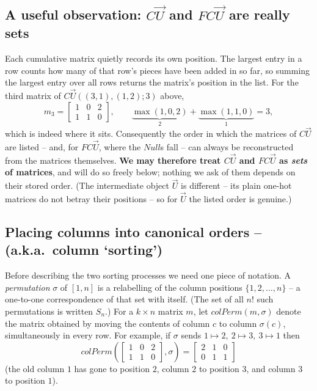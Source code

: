 \documentclass{article}
\begin{document}
\subsection*{A useful observation: $C\vec U$ and $FC\vec U$ are really sets}

Each cumulative matrix quietly records its own position.  The largest entry in a
row counts how many of that row's pieces have been added in so far, so summing the
largest entry over all rows returns the matrix's position in the list.  For the
third matrix of $C\vec U((3,1),(1,2);3)$ above,
\[
m_3=\begin{bmatrix}1&0&2\\1&1&0\end{bmatrix},
\qquad
\underbrace{\max(1,0,2)}_{2}+\underbrace{\max(1,1,0)}_{1}=3,
\]
which is indeed where it sits.  Consequently the order in which the matrices of
$C\vec U$ are listed -- and, for $FC\vec U$, where the $Null$s fall -- can always be
reconstructed from the matrices themselves.  \textbf{We may therefore treat
$C\vec U$ and $FC\vec U$ as \emph{sets} of matrices}, and will do so freely below;
nothing we ask of them depends on their stored order.  (The intermediate object
$\vec U$ is different -- its plain one-hot matrices do not betray their positions --
so for $\vec U$ the listed order is genuine.)

\subsection{Placing columns into canonical orders -- (a.k.a.~column `sorting')}
\label{subsec:sorting}

\label{def:colperm}Before describing the two sorting processes we need one piece of notation.  A
\emph{permutation} $\sigma$ of $[1,n]$ is a relabelling of the column positions
$\{1,2,\ldots,n\}$ -- a one-to-one correspondence of that set with itself.  (The set
of all $n!$ such permutations is written $S_n$.)  For a
$k\times n$ matrix $m$, let $colPerm(m,\sigma)$ denote the matrix obtained by moving
the contents of column $c$ to column $\sigma(c)$, simultaneously in every row.  For
example, if $\sigma$ sends $1\mapsto2,\ 2\mapsto3,\ 3\mapsto1$ then
$$
colPerm\left(\begin{bmatrix}1&0&2\\1&1&0\end{bmatrix},\sigma\right)
=\begin{bmatrix}2&1&0\\0&1&1\end{bmatrix}
$$
(the old column $1$ has gone to position $2$, column $2$ to position $3$, and column
$3$ to position $1$).
\end{document}
